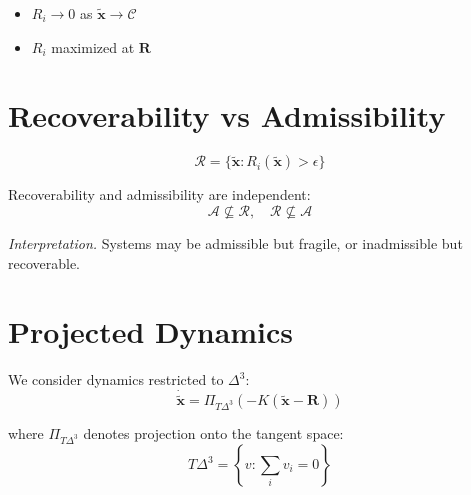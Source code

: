 \documentclass[letterpaper, 10 pt, conference]{ieeeconf}
\begin{document}
\begin{proposition}[Extrema]
\begin{itemize}
\item $R_i \to 0$ as $\tilde{\mathbf{x}} \to \mathcal{C}$
\item $R_i$ maximized at $\mathbf{R}$
\end{itemize}
\end{proposition}

\section{Recoverability vs Admissibility}

\begin{definition}
\begin{equation}
\mathcal{R} = \{ \tilde{\mathbf{x}} : R_i(\tilde{\mathbf{x}}) > \epsilon \}
\end{equation}
\end{definition}

\begin{proposition}
Recoverability and admissibility are independent:
\begin{equation}
\mathcal{A} \not\subseteq \mathcal{R}, \quad \mathcal{R} \not\subseteq \mathcal{A}
\end{equation}
\end{proposition}

\textit{Interpretation.}
Systems may be admissible but fragile, or inadmissible but recoverable.

\section{Projected Dynamics}

We consider dynamics restricted to $\Delta^3$:
\begin{equation}
\dot{\tilde{\mathbf{x}}} = \Pi_{T\Delta^3}(-K(\tilde{\mathbf{x}} - \mathbf{R}))
\end{equation}

where $\Pi_{T\Delta^3}$ denotes projection onto the tangent space:
\begin{equation}
T\Delta^3 = \left\{ v : \sum_i v_i = 0 \right\}
\end{equation}

\end{document}
